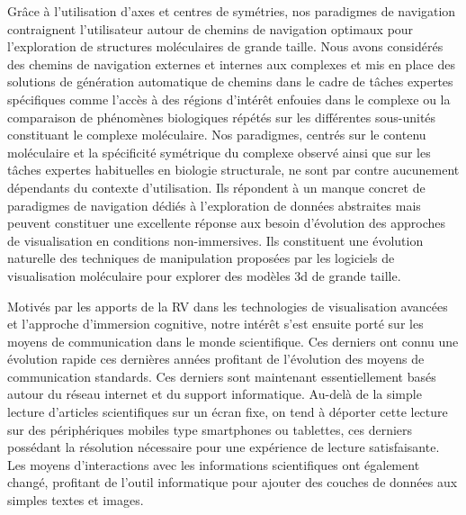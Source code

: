 Grâce à l'utilisation d'axes et centres de symétries, nos paradigmes de navigation contraignent l'utilisateur autour de chemins de navigation optimaux pour l'exploration de structures moléculaires de grande taille. Nous avons considérés des chemins de navigation externes et internes aux complexes et mis en place des solutions de génération automatique de chemins dans le cadre de tâches expertes spécifiques comme l'accès à des régions d'intérêt enfouies dans le complexe ou la comparaison de phénomènes biologiques répétés sur les différentes sous-unités constituant le complexe moléculaire.
Nos paradigmes, centrés sur le contenu moléculaire et la spécificité symétrique du complexe observé ainsi que sur les tâches expertes habituelles en biologie structurale, ne sont par contre aucunement dépendants du contexte d'utilisation. Ils répondent à un manque concret de paradigmes de navigation dédiés à l'exploration de données abstraites mais peuvent constituer une excellente réponse aux besoin d'évolution des approches de visualisation en conditions non-immersives. Ils constituent une évolution naturelle des techniques de manipulation proposées par les logiciels de visualisation moléculaire pour explorer des modèles 3d de grande taille.




Motivés par les apports de la RV dans les technologies de visualisation avancées et l'approche d'immersion cognitive, notre intérêt s'est ensuite porté sur les moyens de communication dans le monde scientifique. Ces derniers ont connu une évolution rapide ces dernières années profitant de l'évolution des moyens de communication standards. Ces derniers sont maintenant essentiellement basés autour du réseau internet et du support informatique. Au-delà de la simple lecture d'articles scientifiques sur un écran fixe, on tend à déporter cette lecture sur des périphériques mobiles type smartphones ou tablettes, ces derniers possédant la résolution nécessaire pour une expérience de lecture satisfaisante. Les moyens d'interactions avec les informations scientifiques ont également changé, profitant de l'outil informatique pour ajouter des couches de données aux simples textes et images.


